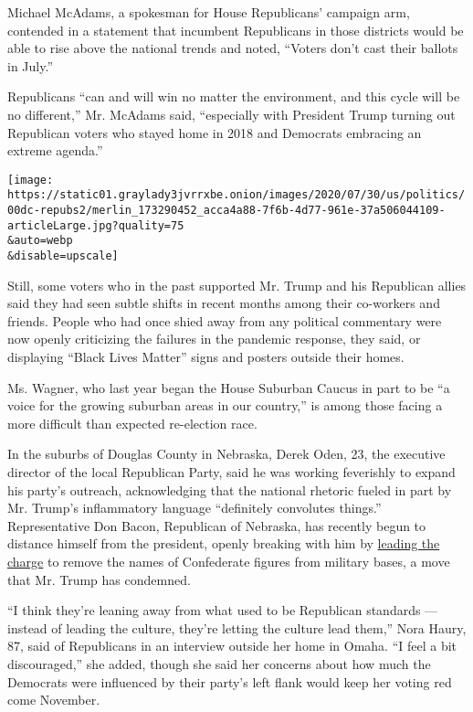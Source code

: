 Michael McAdams, a spokesman for House Republicans' campaign arm,
contended in a statement that incumbent Republicans in those districts
would be able to rise above the national trends and noted, ``Voters
don't cast their ballots in July.''

Republicans ``can and will win no matter the environment, and this cycle
will be no different,'' Mr. McAdams said, ``especially with President
Trump turning out Republican voters who stayed home in 2018 and
Democrats embracing an extreme agenda.''

\texttt{[image: https://static01.graylady3jvrrxbe.onion/images/2020/07/30/us/politics/00dc-repubs2/merlin\_173290452\_acca4a88-7f6b-4d77-961e-37a506044109-articleLarge.jpg?quality=75\\\&auto=webp\\\&disable=upscale]}

Still, some voters who in the past supported Mr. Trump and his
Republican allies said they had seen subtle shifts in recent months
among their co-workers and friends. People who had once shied away from
any political commentary were now openly criticizing the failures in the
pandemic response, they said, or displaying ``Black Lives Matter'' signs
and posters outside their homes.

Ms. Wagner, who last year began the House Suburban Caucus in part to be
``a voice for the growing suburban areas in our country,'' is among
those facing a more difficult than expected re-election race.

In the suburbs of Douglas County in Nebraska, Derek Oden, 23, the
executive director of the local Republican Party, said he was working
feverishly to expand his party's outreach, acknowledging that the
national rhetoric fueled in part by Mr. Trump's inflammatory language
``definitely convolutes things.'' Representative Don Bacon, Republican
of Nebraska, has recently begun to distance himself from the president,
openly breaking with him by
\href{https://www.nytimes3xbfgragh.onion/2020/07/20/us/politics/congress-trump-confederate-base-names.html}{leading
the charge} to remove the names of Confederate figures from military
bases, a move that Mr. Trump has condemned.

``I think they're leaning away from what used to be Republican standards
--- instead of leading the culture, they're letting the culture lead
them,'' Nora Haury, 87, said of Republicans in an interview outside her
home in Omaha. ``I feel a bit discouraged,'' she added, though she said
her concerns about how much the Democrats were influenced by their
party's left flank would keep her voting red come November.

